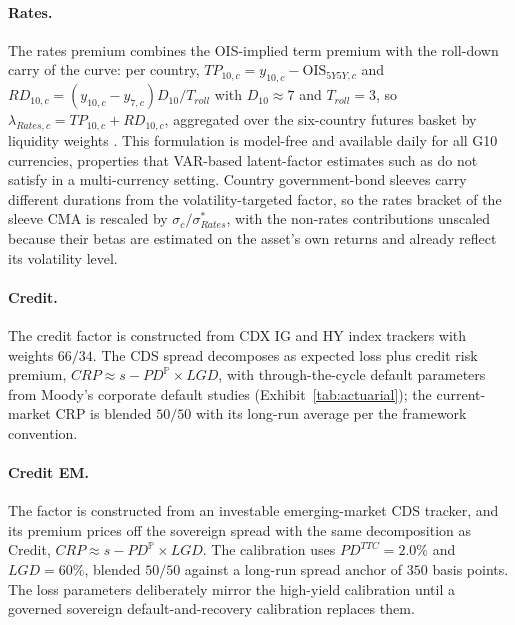 \documentclass[pdftex,12pt,a4paper]{article}
\begin{document}
\paragraph*{Rates.} The rates premium combines the OIS-implied term premium with the roll-down carry of the curve: per country, $TP_{10,c} = y_{10,c} - \text{OIS}_{5Y5Y,c}$ and $RD_{10,c} = (y_{10,c} - y_{7,c}) D_{10}/T_{roll}$ with $D_{10} \approx 7$ and $T_{roll} = 3$, so $\lambda_{Rates,c} = TP_{10,c} + RD_{10,c}$, aggregated over the six-country futures basket by liquidity weights \citep{Ilmanen2011}. This formulation is model-free and available daily for all G10 currencies, properties that VAR-based latent-factor estimates such as \cite{ACM2013} do not satisfy in a multi-currency setting. Country government-bond sleeves carry different durations from the volatility-targeted factor, so the rates bracket of the sleeve CMA is rescaled by $\sigma_c/\sigma^*_{Rates}$, with the non-rates contributions unscaled because their betas are estimated on the asset's own returns and already reflect its volatility level.

\paragraph*{Credit.} The credit factor is constructed from CDX IG and HY index trackers with weights $66/34$. The CDS spread decomposes as expected loss plus credit risk premium, $CRP \approx s - PD^{\mathbb{P}} \times LGD$, with through-the-cycle default parameters from Moody's corporate default studies (Exhibit~\ref{tab:actuarial}); the current-market CRP is blended $50/50$ with its long-run average per the framework convention.

\paragraph*{Credit EM.} The factor is constructed from an investable emerging-market CDS tracker, and its premium prices off the sovereign spread with the same decomposition as Credit, $CRP \approx s - PD^{\mathbb{P}} \times LGD$. The calibration uses $PD^{TTC} = 2.0\%$ and $LGD = 60\%$, blended $50/50$ against a long-run spread anchor of $350$ basis points. The loss parameters deliberately mirror the high-yield calibration until a governed sovereign default-and-recovery calibration replaces them.
\end{document}
